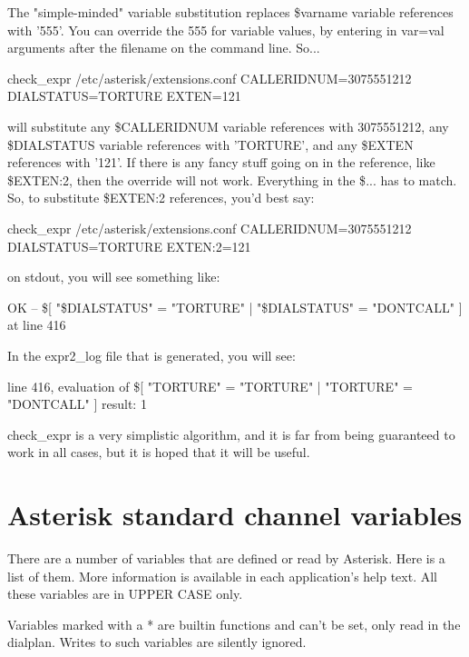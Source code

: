The "simple-minded" variable substitution replaces \${varname} variable
references with '555'. You can override the 555 for variable values,
by entering in var=val arguments after the filename on the command
line.  So...

 check\_expr /etc/asterisk/extensions.conf CALLERIDNUM=3075551212 DIALSTATUS=TORTURE EXTEN=121

will substitute any \${CALLERIDNUM} variable references with
3075551212, any \${DIALSTATUS} variable references with 'TORTURE', and
any \${EXTEN} references with '121'.  If there is any fancy stuff
going on in the reference, like \${EXTEN:2}, then the override will
not work. Everything in the \${...} has to match. So, to substitute
\${EXTEN:2} references, you'd best say:

 check\_expr /etc/asterisk/extensions.conf CALLERIDNUM=3075551212 DIALSTATUS=TORTURE EXTEN:2=121

on stdout, you will see something like:

 OK -- \$[ "\${DIALSTATUS}"  = "TORTURE" | "\${DIALSTATUS}" = "DONTCALL" ] at line 416

In the expr2\_log file that is generated, you will see:

 line 416, evaluation of \$[  "TORTURE"  = "TORTURE" | "TORTURE" = "DONTCALL"  ] result: 1

check\_expr is a very simplistic algorithm, and it is far from being
guaranteed to work in all cases, but it is hoped that it will be
useful.

\section{Asterisk standard channel variables}

There are a number of variables that are defined or read
by Asterisk. Here is a list of them. More information is
available in each application's help text. All these variables
are in UPPER CASE only.

Variables marked with a * are builtin functions and can't be set,
only read in the dialplan.  Writes to such variables are silently 
ignored.

